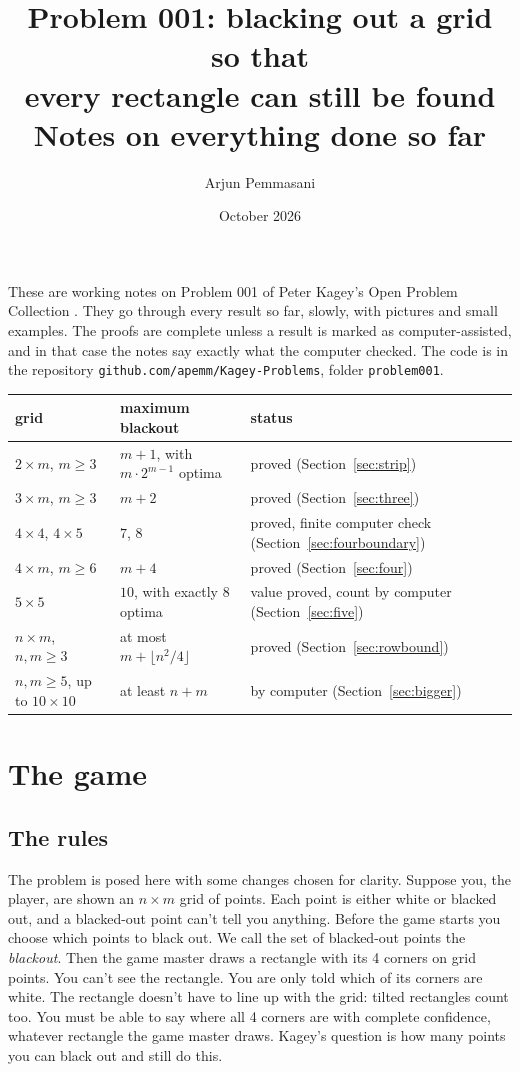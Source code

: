 \documentclass[11pt]{article}
\title{Problem 001: blacking out a grid so that\\ every rectangle can still be found\\[4pt]
\large Notes on everything done so far}
\author{Arjun Pemmasani}
\date{October 2026}
\theoremstyle{definition}
\theoremstyle{remark}
\begin{document}
\maketitle

\noindent These are working notes on Problem 001 of Peter Kagey's Open Problem Collection
\cite{kagey}. They go through every result so far, slowly, with pictures and small examples.
The proofs are complete unless a result is marked as computer-assisted, and in that case the
notes say exactly what the computer checked. The code is in the repository
\texttt{github.com/apemm/Kagey-Problems}, folder \texttt{problem001}.

\begin{center}\small
\begin{tabular}{lll}
\toprule
grid & maximum blackout & status \\
\midrule
$2\times m$, $m\ge3$ & $m+1$, with $m\cdot2^{m-1}$ optima & proved (Section~\ref{sec:strip}) \\
$3\times m$, $m\ge3$ & $m+2$ & proved (Section~\ref{sec:three}) \\
$4\times4$, $4\times5$ & $7$, $8$ & proved, finite computer check (Section~\ref{sec:fourboundary}) \\
$4\times m$, $m\ge6$ & $m+4$ & proved (Section~\ref{sec:four}) \\
$5\times5$ & $10$, with exactly 8 optima & value proved, count by computer (Section~\ref{sec:five}) \\
$n\times m$, $n,m\ge3$ & at most $m+\lfloor n^2/4\rfloor$ & proved (Section~\ref{sec:rowbound}) \\
$n,m\ge5$, up to $10\times10$ & at least $n+m$ & by computer (Section~\ref{sec:bigger}) \\
\bottomrule
\end{tabular}
\end{center}

\tableofcontents

\section{The game}\label{sec:game}

\subsection{The rules}

The problem is posed here with some changes chosen for clarity. Suppose you, the player, are
shown an $n\times m$ grid of points. Each point is either white or blacked out, and a
blacked-out point can't tell you anything. Before the game starts you choose which points to
black out. We call the set of blacked-out points the \emph{blackout}. Then the game master draws
a rectangle with its 4 corners on grid points. You can't see the rectangle. You are only told
which of its corners are white. The rectangle doesn't have to line up with the grid: tilted
rectangles count too. You must be able to say where all 4 corners are with complete confidence,
whatever rectangle the game master draws. Kagey's question is how many points you can black
out and still do this.
\end{document}
